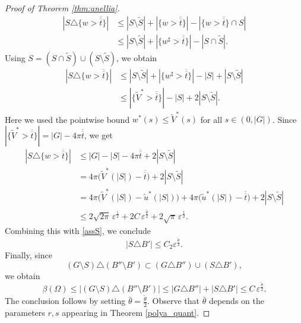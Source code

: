 \documentclass[oneside,a4paper,11pt,notitlepage]{article}
\theoremstyle{definition}
\theoremstyle{plain}
\theoremstyle{definition}
\begin{document}
\begin{proof}[Proof of Theorem \ref{thm:anellia}]
\begin{equation*}
\begin{aligned}
|S\triangle\{w>\overline{\overline t}\}|
&\leq |S\setminus \tilde S|
+ |\{w>\overline{\overline t}\}| - |\{w>\overline{\overline t}\}\cap S| \\
&\leq |S\setminus \tilde S|
+ |\{w^\sharp>\overline{\overline t}\}| - |S\cap \tilde S|.
\end{aligned}
\end{equation*}
Using $S=(S\cap \tilde S)\cup(S\setminus \tilde S)$, we obtain
\begin{equation*}
\begin{aligned}
|S\triangle\{w>\overline{\overline t}\}|
&\leq |S\setminus \tilde S|
+ |\{w^\sharp>\overline{\overline t}\}| - |S|
+ |S\setminus \tilde S| \\
&\leq |\{\tilde V^*>\overline{\overline t}\}| - |S|
+ 2|S\setminus \tilde S|.
\end{aligned}
\end{equation*}
Here we used the pointwise bound $w^*(s)\leq \tilde V^*(s)$ for all $s\in(0,|G|)$. Since $|\{\tilde V^*>\overline{\overline t}\}|=|G|-4\pi \overline{\overline t}$, we get
\begin{equation*}
\begin{aligned}
|S\triangle\{w>\overline{\overline t}\}|
&\leq |G|-|S|-4\pi \overline{\overline t}
+ 2|S\setminus \tilde S| \\
&= 4\pi\bigl(\tilde V^*(|S|)-\overline{\overline t}\bigr)
+ 2|S\setminus \tilde S| \\
&= 4\pi\bigl(\tilde V^*(|S|)-\tilde u^*(|S|)\bigr)
+ 4\pi\bigl(\tilde u^*(|S|)-\overline{\overline t}\bigr)
+ 2|S\setminus \tilde S| \\
&\leq 2\sqrt{2\pi}\,\varepsilon^{\frac12}
+ 2C\,\varepsilon^{\frac{\tilde\theta}{2}}
+ 2\sqrt{\pi}\,\varepsilon^{\frac12}.
\end{aligned}
\end{equation*}
Combining this with \eqref{assS}, we conclude
\begin{equation*}
|S\triangle B'| \leq C_2 \varepsilon^{\frac{\tilde\theta}{2}}.
\end{equation*}
Finally, since
\[
(G\setminus S)\triangle(B''\setminus B')
\subset (G\triangle B'') \cup (S\triangle B'),
\]
we obtain
\[
\beta(\Omega)
\leq |(G\setminus S)\triangle(B''\setminus B')|
\leq |G\triangle B''| + |S\triangle B'|
\leq C\,\varepsilon^{\frac{\tilde\theta}{2}}.
\]
The conclusion follows by setting $\bar\theta=\frac{\tilde\theta}{2}$. 
Observe that $\bar\theta$ depends on the parameters $r,s$ appearing in Theorem \ref{polya_quant}.
\end{proof}
\end{document}
